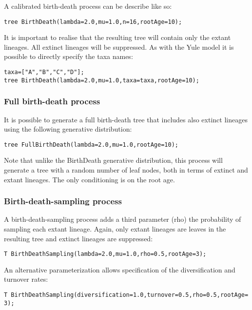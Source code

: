 \documentclass[10pt,letterpaper,table]{article}
\begin{document}
A calibrated birth-death process can be describe like so:

\begin{alltt}
  tree ~ BirthDeath(lambda=2.0, mu=1.0, n=16, rootAge=10);
\end{alltt}

It is important to realise that the resulting tree will contain only the extant lineages. All extinct lineages will be
suppressed. As with the Yule model it is possible to directly specify the taxa names:

\begin{alltt}
  taxa = ["A", "B", "C", "D"];
  tree ~ BirthDeath(lambda=2.0, mu=1.0, taxa=taxa, rootAge=10);
\end{alltt}

\subsubsection*{Full birth-death process}

It is possible to generate a full birth-death tree that includes also extinct lineages using the following generative
distribution:

\begin{alltt}
  tree ~ FullBirthDeath(lambda=2.0, mu=1.0, rootAge=10);
\end{alltt}

Note that unlike the BirthDeath generative distribution, this process will generate a tree with a random number of
leaf nodes, both in terms of extinct and extant lineages. The only conditioning is on the root age.

\subsubsection*{Birth-death-sampling process}

A birth-death-sampling process adds a third parameter (rho) the probability of sampling each extant lineage. Again,
only extant lineages are leaves in the resulting tree and extinct lineages are suppressed:

\begin{alltt}
  T ~ BirthDeathSampling(lambda=2.0, mu=1.0, rho=0.5, rootAge=3);
\end{alltt}

An alternative parameterization allows specification of the diversification and turnover rates:

\begin{alltt}
  T ~ BirthDeathSampling(diversification=1.0, turnover=0.5, rho=0.5, rootAge=3);
\end{alltt}
\end{document}

